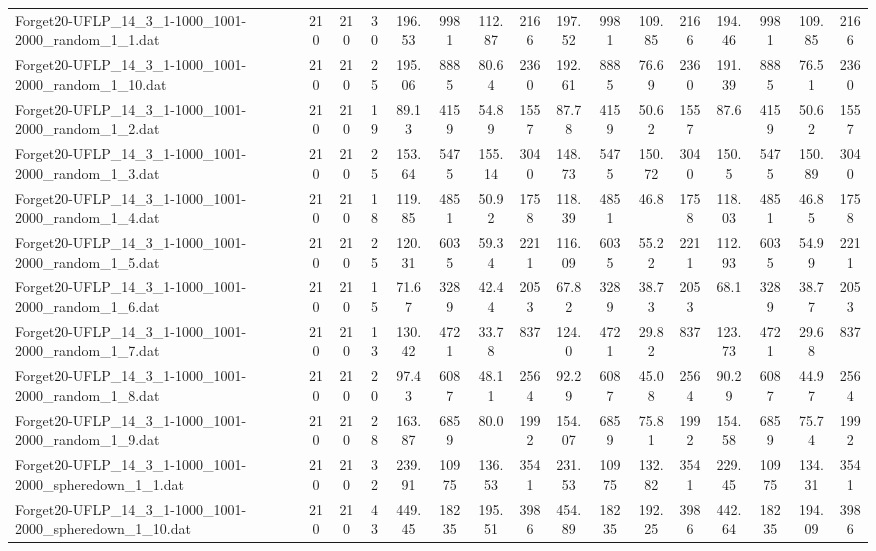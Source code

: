 \begin{sidewaystable}[!ht]
{\begin{tabular}{lccccccccccccccc}
Forget20-UFLP\_14\_3\_1-1000\_1001-2000\_random\_1\_1.dat & 210 & 210 & 30 & 196.53 & 9981 & 112.87 & 2166 & 197.52 & 9981 &  \textcolor{blue2}{109.85} & 2166 & 194.46 & 9981 &  \textcolor{blue2}{109.85} & 2166 \\
Forget20-UFLP\_14\_3\_1-1000\_1001-2000\_random\_1\_10.dat & 210 & 210 & 25 & 195.06 & 8885 & 80.64 & 2360 & 192.61 & 8885 & 76.69 & 2360 & 191.39 & 8885 &  \textcolor{blue2}{76.51} & 2360 \\
Forget20-UFLP\_14\_3\_1-1000\_1001-2000\_random\_1\_2.dat & 210 & 210 & 19 & 89.13 & 4159 & 54.89 & 1557 & 87.78 & 4159 &  \textcolor{blue2}{50.62} & 1557 & 87.6 & 4159 &  \textcolor{blue2}{50.62} & 1557 \\
Forget20-UFLP\_14\_3\_1-1000\_1001-2000\_random\_1\_3.dat & 210 & 210 & 25 & 153.64 & 5475 & 155.14 & 3040 & 148.73 & 5475 & 150.72 & 3040 & 150.5 & 5475 & 150.89 & 3040 \\
Forget20-UFLP\_14\_3\_1-1000\_1001-2000\_random\_1\_4.dat & 210 & 210 & 18 & 119.85 & 4851 & 50.92 & 1758 & 118.39 & 4851 &  \textcolor{blue2}{46.8} & 1758 & 118.03 & 4851 & 46.85 & 1758 \\
Forget20-UFLP\_14\_3\_1-1000\_1001-2000\_random\_1\_5.dat & 210 & 210 & 25 & 120.31 & 6035 & 59.34 & 2211 & 116.09 & 6035 & 55.22 & 2211 & 112.93 & 6035 &  \textcolor{blue2}{54.99} & 2211 \\
Forget20-UFLP\_14\_3\_1-1000\_1001-2000\_random\_1\_6.dat & 210 & 210 & 15 & 71.67 & 3289 & 42.44 & 2053 & 67.82 & 3289 &  \textcolor{blue2}{38.73} & 2053 & 68.1 & 3289 & 38.77 & 2053 \\
Forget20-UFLP\_14\_3\_1-1000\_1001-2000\_random\_1\_7.dat & 210 & 210 & 13 & 130.42 & 4721 & 33.78 & 837 & 124.0 & 4721 & 29.82 & 837 & 123.73 & 4721 & 29.68 & 837 \\
Forget20-UFLP\_14\_3\_1-1000\_1001-2000\_random\_1\_8.dat & 210 & 210 & 20 & 97.43 & 6087 & 48.11 & 2564 & 92.29 & 6087 & 45.08 & 2564 & 90.29 & 6087 &  \textcolor{blue2}{44.97} & 2564 \\
Forget20-UFLP\_14\_3\_1-1000\_1001-2000\_random\_1\_9.dat & 210 & 210 & 28 & 163.87 & 6859 & 80.0 & 1992 & 154.07 & 6859 & 75.81 & 1992 & 154.58 & 6859 &  \textcolor{blue2}{75.74} & 1992 \\
Forget20-UFLP\_14\_3\_1-1000\_1001-2000\_spheredown\_1\_1.dat & 210 & 210 & 32 & 239.91 & 10975 & 136.53 & 3541 & 231.53 & 10975 &  \textcolor{blue2}{132.82} & 3541 & 229.45 & 10975 & 134.31 & 3541 \\
Forget20-UFLP\_14\_3\_1-1000\_1001-2000\_spheredown\_1\_10.dat & 210 & 210 & 43 & 449.45 & 18235 & 195.51 & 3986 & 454.89 & 18235 & 192.25 & 3986 & 442.64 & 18235 & 194.09 & 3986 \\

\end{tabular}}
\end{sidewaystable}
